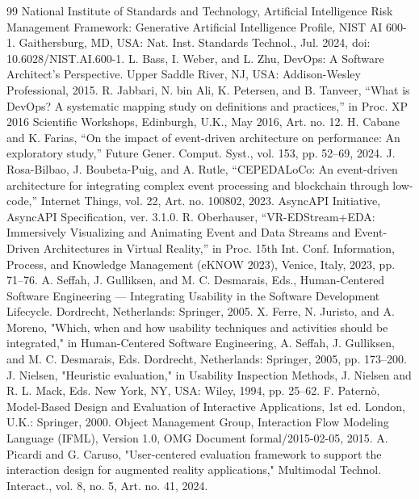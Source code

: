 \documentclass[conference]{IEEEtran}
\begin{document}
\begin{thebibliography}{99}
 National Institute of Standards and Technology, Artificial Intelligence Risk Management Framework: Generative Artificial Intelligence Profile, NIST AI 600-1. Gaithersburg, MD, USA: Nat. Inst. Standards Technol., Jul. 2024, doi: 10.6028/NIST.AI.600-1.
 L. Bass, I. Weber, and L. Zhu, DevOps: A Software Architect's Perspective. Upper Saddle River, NJ, USA: Addison-Wesley Professional, 2015.
 R. Jabbari, N. bin Ali, K. Petersen, and B. Tanveer, ``What is DevOps? A systematic mapping study on definitions and practices,'' in Proc. XP 2016 Scientific Workshops, Edinburgh, U.K., May 2016, Art. no. 12.
 H. Cabane and K. Farias, ``On the impact of event-driven architecture on performance: An exploratory study,'' Future Gener. Comput. Syst., vol. 153, pp. 52–69, 2024.
 J. Rosa-Bilbao, J. Boubeta-Puig, and A. Rutle, ``CEPEDALoCo: An event-driven architecture for integrating complex event processing and blockchain through low-code,'' Internet Things, vol. 22, Art. no. 100802, 2023.
 AsyncAPI Initiative, AsyncAPI Specification, ver. 3.1.0.
 R. Oberhauser, ``VR-EDStream+EDA: Immersively Visualizing and Animating Event and Data Streams and Event-Driven Architectures in Virtual Reality,'' in Proc. 15th Int. Conf. Information, Process, and Knowledge Management (eKNOW 2023), Venice, Italy, 2023, pp. 71–76.
 A. Seffah, J. Gulliksen, and M. C. Desmarais, Eds., Human-Centered Software Engineering — Integrating Usability in the Software Development Lifecycle. Dordrecht, Netherlands: Springer, 2005.
 X. Ferre, N. Juristo, and A. Moreno, "Which, when and how usability techniques and activities should be integrated," in Human-Centered Software Engineering, A. Seffah, J. Gulliksen, and M. C. Desmarais, Eds. Dordrecht, Netherlands: Springer, 2005, pp. 173–200.
 J. Nielsen, "Heuristic evaluation," in Usability Inspection Methods, J. Nielsen and R. L. Mack, Eds. New York, NY, USA: Wiley, 1994, pp. 25–62.
 F. Paternò, Model-Based Design and Evaluation of Interactive Applications, 1st ed. London, U.K.: Springer, 2000.
 Object Management Group, Interaction Flow Modeling Language (IFML), Version 1.0, OMG Document formal/2015-02-05, 2015.
 A. Picardi and G. Caruso, "User-centered evaluation framework to support the interaction design for augmented reality applications," Multimodal Technol. Interact., vol. 8, no. 5, Art. no. 41, 2024.
\end{thebibliography}
\end{document}
